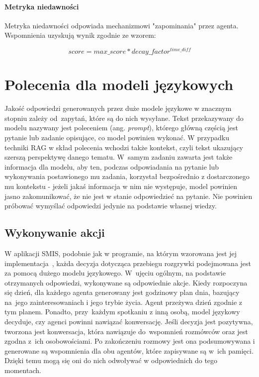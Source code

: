 \paragraph{Metryka niedawności}
Metryka niedawności odpowiada mechanizmowi "zapominania" przez agenta.
Wspomnienia uzyskują wynik zgodnie ze wzorem:

\begin{equation}
 \label{eq:metryka_niedawnosci}
	score = max\_score * decay\_factor ^ {time\_diff}
\end{equation}




\section{Polecenia dla modeli językowych}

Jakość odpowiedzi generowanych przez duże modele językowe w znacznym stopniu zależy od~zapytań, które są do nich wysyłane. Tekst przekazywany do modelu nazywany jest poleceniem (ang. \textit{prompt}), którego główną częścią jest pytanie lub zadanie opisujące, co model powinien wykonać. W przypadku techniki RAG w skład polecenia wchodzi także kontekst, czyli tekst ukazujący szerszą perspektywę danego tematu. W~samym zadaniu zawarta jest także informacja dla modelu, aby ten, podczas odpowiadania na pytanie lub wykonywania postawionego mu zadania, korzystał bezpośrednio z dostarczonego mu kontekstu - jeżeli jakaś informacja w nim nie występuje, model powinien jasno zakomunikować, że nie jest w stanie odpowiedzieć na pytanie. Nie powinien próbować wymyślać odpowiedzi jedynie na podstawie własnej wiedzy.

\subsection{Wykonywanie akcji}

W aplikacji SMIS, podobnie jak w programie, na którym wzorowana jest jej implementacja~\cite{park2023generativeagentsinteractivesimulacra}, każda decyzja dotycząca przebiegu rozgrywki podejmowana jest za pomocą dużego modelu językowego. W~ujęciu ogólnym, na podstawie otrzymanych odpowiedzi, wykonywane są odpowiednie akcje. Kiedy rozpoczyna się dzień, dla każdego agenta generowany jest godzinowy plan dnia, bazujący na~jego zainteresowaniach i jego trybie życia. Agent przeżywa dzień zgodnie z tym planem. Ponadto, przy~każdym spotkaniu z inną osobą, model językowy decyduje, czy agenci powinni nawiązać konwersację. Jeśli decyzja jest pozytywna, tworzona jest konwersacja, która nawiązuje do~wspomnień rozmówców oraz jest zgodna z~ich osobowościami. Po zakończeniu rozmowy jest ona podsumowywana i generowane są wspomnienia dla obu agentów, które zapisywane są w~ich pamięci. Dzięki temu mogą się oni do nich odwoływać w odpowiednich do tego momentach.

